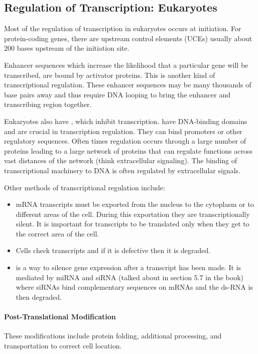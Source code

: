 \documentclass[../Bio_chemistryReview.tex]{subfiles}
\begin{document}
\subsection{Regulation of Transcription: Eukaryotes}
Most of the regulation of transcription in eukaryotes occurs at initiation. For
protein-coding genes, there are upstream control elements (UCEs) usually about
200 bases upstream of the initiation site.\par

Enhancer sequences which increase the likelihood that a particular gene will be
transcribed, are bound by activator proteins. This is another kind of
transcriptional regulation. These enhancer sequences may be many thousands of
base pairs away and thus require DNA looping to bring the enhancer and
transcribing region together.\par

Eukaryotes also have , which inhibit
transcription.  have DNA-binding domains and are
crucial in transcription regulation. They can bind promoters or other regulatory
sequences. Often times regulation occurs through a large number of proteins
leading to a large network of proteins that can regulate functions across vast
distances of the network (think extracellular signaling). The binding of
transcriptional machinery to DNA is often regulated by extracellular
signals.\par

Other methods of transcriptional regulation include:
\begin{itemize}
  \item {} mRNA transcripts must be exported from the
    nucleus to the cytoplasm or to different areas of the cell. During this
    exportation they are transcriptionally silent. It is important for
    transcripts to be translated only when they get to the correct area of the
    cell.
  \item {} Cells check transcripts and if it is
    defective then it is degraded.
  \item {} is a way to silence gene expression after a
    transcript has been made. It is mediated by miRNA and siRNA (talked about in
    section 5.7 in the book) where siRNAs bind complementary sequences on mRNAs
    and the ds-RNA is then degraded.
\end{itemize}

\paragraph{Post-Translational Modification}
These modifications include protein folding, additional processing, and
transportation to correct cell location.
\end{document}
